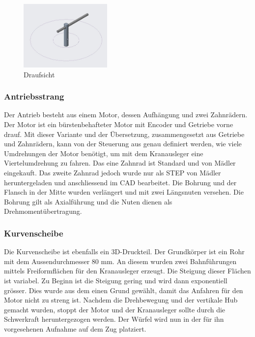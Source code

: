 \documentclass[../../main.tex]{subfiles}
\begin{document}
        \begin{figure}[H]
            \centering
            \includegraphics[width=0.4\textwidth]{../../images/Kran/Top.JPG}
            \caption {Draufsicht}
        \end{figure}



    \subsubsection{Antriebsstrang}
        Der Antrieb besteht aus einem Motor, dessen Aufhängung und zwei Zahnrädern. Der Motor ist ein bürstenbehafteter
        Motor mit Encoder und Getriebe vorne drauf. Mit dieser Variante und der Übersetzung, zusammengesetzt aus Getriebe
        und Zahnrädern, kann von der Steuerung aus genau definiert werden, wie viele Umdrehungen der Motor benötigt, um
        mit dem Kranausleger eine Viertelumdrehung zu fahren. Das eine Zahnrad ist Standard und von Mädler eingekauft.
        Das zweite Zahnrad jedoch wurde nur als STEP von Mädler heruntergeladen und anschliessend im CAD bearbeitet. Die
        Bohrung und der Flansch in der Mitte wurden verlängert und mit zwei Längsnuten versehen. Die Bohrung gilt als
        Axialführung und die Nuten dienen als Drehmomentübertragung.


        \subsubsection{Kurvenscheibe}
        Die Kurvenscheibe ist ebenfalls ein 3D-Druckteil. Der Grundkörper ist ein Rohr mit dem Aussendurchmesser 80 mm. An diesem wurden zwei Bahnführungen mittels Freiformflächen für den Kranausleger erzeugt. Die Steigung dieser Flächen ist variabel. Zu Beginn ist die Steigung gering und wird dann exponentiell grösser. Dies wurde aus dem einen Grund gewählt, damit das Anfahren für den Motor nicht zu streng ist. Nachdem die Drehbewegung und der vertikale Hub gemacht wurden, stoppt der Motor und der Kranausleger sollte durch die Schwerkraft heruntergezogen werden. Der Würfel wird nun in der für ihn vorgesehenen Aufnahme auf dem Zug platziert.\\
\end{document}
